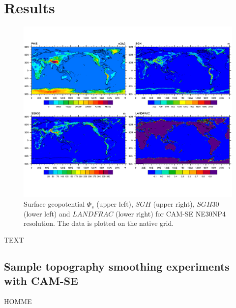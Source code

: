 \documentclass[gmd]{copernicus}
\begin{document}
\section{Results}
\begin{figure}[t]
\vspace*{2mm}
\begin{center}
\includegraphics[width=12cm]{fig/topo-vars_global}
\end{center}
  \caption{Surface geopotential $\Phi_s$ (upper left), $SGH$ (upper right), $SGH30$ (lower left) and $LANDFRAC$ (lower right) for CAM-SE NE30NP4 resolution. The data is plotted on the native grid.}\label{fig:topo-vars}
\end{figure}


TEXT

\subsection{Sample topography smoothing experiments with CAM-SE}
HOMME \citep[High-Order Method Modeling Environment; ][]{HOMME,DetAl2005IJHPCA}\\
\end{document}
